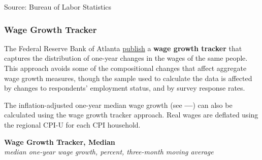 \documentclass{report}
\makeatletter
\newcommand{\tbllink}[1]{\href{https://raw.githubusercontent.com/bdecon/US-chartbook/master/chartbook/data/#1}{\faTable}}
\newcommand*\short[1]{\expandafter\@gobbletwo\number\numexpr#1\relax}
\newcommand{\absnode}[3]{\node[below right, align=left] at (axis cs: #1,#2) {#3};}
\newcommand{\dateaxisticks}{
		date coordinates in=x, axis line style={draw=none},
		xmax={2024-01-31},
		max space between ticks=40,	    
		xtick={{1990-01-01}, {1992-01-01}, {1994-01-01}, 
			{1996-01-01}, {1998-01-01}, {2000-01-01}, 
			{2002-01-01}, {2004-01-01}, {2006-01-01},
			{2008-01-01}, {2010-01-01}, {2012-01-01}, {2014-01-01},
		    {2016-01-01}, {2018-01-01}, {2020-01-01}, {2022-01-01}, 
		    {2024-01-01}, {2026-01-01}},
		minor xtick={{1989-01-01}, {1991-01-01}, {1993-01-01},
			{1995-01-01}, {1997-01-01}, {1999-01-01}, 
			{2001-01-01}, {2003-01-01}, {2005-01-01}, {2007-01-01},
		    {2009-01-01}, {2011-01-01}, {2013-01-01}, {2015-01-01},
		    {2017-01-01}, {2019-01-01}, {2021-01-01}, {2023-01-01}, 
		    {2025-01-01}, {2027-01-01}},
		enlarge y limits={0.06}, enlarge x limits={0.01},
		xticklabel style={align=center, yshift=-2pt}, tick label style={inner sep=0pt},
		}
\newcommand{\bbar}[2]{extra #1 ticks = {{#2}}, extra #1 tick labels = ,
		extra #1 tick style = {grid=major, grid style={thick, black!25}},}
\newcommand{\rbars}{
		\fill[color=black!10] (axis cs:{1990-07-01},\pgfkeysvalueof{/pgfplots/ymin})
			rectangle (axis cs:{1991-03-01}, \pgfkeysvalueof{/pgfplots/ymax});
		\fill[color=black!10] (axis cs:{2007-12-01},\pgfkeysvalueof{/pgfplots/ymin})
			rectangle (axis cs:{2009-07-01}, \pgfkeysvalueof{/pgfplots/ymax});
		\fill[color=black!10] (axis cs:{2001-03-01},\pgfkeysvalueof{/pgfplots/ymin})
			rectangle (axis cs:{2001-11-01}, \pgfkeysvalueof{/pgfplots/ymax});
		\fill[color=black!10] (axis cs:{2020-02-01},\pgfkeysvalueof{/pgfplots/ymin})
			rectangle (axis cs:{2020-05-01}, \pgfkeysvalueof{/pgfplots/ymax});}
\makeatother
\begin{document}
{\begin{minipage}{1.0\textwidth}
\hspace{1mm}  

\footnotesize{Source: Bureau of Labor Statistics} \hfill \tbllink{eci_yy.csv}
\end{minipage}
\newpage
\begin{minipage}{1.0\textwidth}    
\subsubsection*{Wage Growth Tracker}
\small The Federal Reserve Bank of Atlanta \href{https://www.frbatlanta.org/chcs/wage-growth-tracker}{publish} a \textbf{wage growth tracker} that captures the distribution of one-year changes in the wages of the same people. This approach avoids some of the compositional changes that affect aggregate wage growth measures, though the sample used to calculate the data is affected by changes to respondents' employment status, and by survey response rates. 



The inflation-adjusted one-year median wage growth (see {\color{purple!80!magenta!80!white}\textbf{---}}) can also be calculated using the wage growth tracker approach. Real wages are deflated using the regional CPI-U for each CPI household. 
\vspace{1mm}

\normalsize \textbf{Wage Growth Tracker, Median}\\
\footnotesize{\textit{median one-year wage growth, percent, three-month moving average}}
\vspace{3.0cm}


\end{minipage}}
\end{document}
